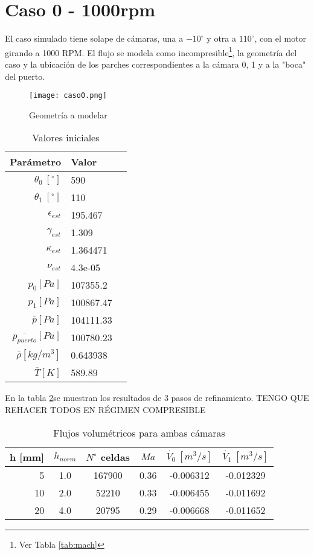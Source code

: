 \section{Caso 0 - 1000rpm}

El caso simulado tiene solape de cámaras, una a $-10^{\circ}$ y otra a
$110^{\circ}$, con el motor girando a 1000 RPM.
%
El flujo se modela como incompresible\footnote{Ver Tabla \ref{tab:mach}}, la
geometría del caso y la ubicación de los parches correspondientes a la cámara
0, 1 y a la "boca" del puerto.

\begin{figure}
    \centering
    \texttt{[image: caso0.png]}
    \caption{Geometría a modelar}
    \label{fig:caso0}
\end{figure}

\begin{table}
    \centering
    \begin{tabular}{rll}\toprule
        Parámetro & Valor \\ \midrule
        $\theta_0\ [^{\circ}]$ & 590 \\
        $\theta_1\ [^{\circ}]$ & 110 \\
        $\epsilon_{est}$ & 195.467 \\
        $\gamma_{est}$ & 1.309 \\
        $\kappa_{est}$ & 1.364471 \\
        $\nu_{est}$ & 4.3e-05 \\
        $p_0 [Pa]$ & 107355.2 \\
        $p_1 [Pa]$ & 100867.47 \\
        $\overline{p} [Pa]$ & 104111.33 \\
        $\overline{p_{puerto}} [Pa]$ & 100780.23 \\
        $\overline{\rho} [kg/m^3]$ & 0.643938 \\
        $\overline{T} [K]$ & 589.89 \\ \bottomrule
    \end{tabular}
    \caption{Valores iniciales}
    \label{tab:caso0_ci}
\end{table}


En la tabla \ref{tab:res_caso0}se muestran los resultados de 3 pasos de
refinamiento. TENGO QUE REHACER TODOS EN RÉGIMEN COMPRESIBLE

\begin{table}
    \centering
    \begin{tabular}{rccccc}\toprule
        h [mm] & $h_{norm}$ & $N^{\circ}$ celdas & $Ma$ & $\dot{V_{0}}\ [m^3/s] $ & $\dot{V_{1}}\ [m^3/s]$ \\ \midrule
        5      & 1.0        & 167900             & 0.36 & -0.006312     & -0.012329 \\
        10     & 2.0        & 52210              & 0.33 & -0.006455     & -0.011692 \\
        20     & 4.0        & 20795              & 0.29 & -0.006668     & -0.011652 \\ \bottomrule
    \end{tabular}
    \caption{Flujos volumétricos para ambas cámaras}
    \label{tab:res_caso0}
\end{table}

